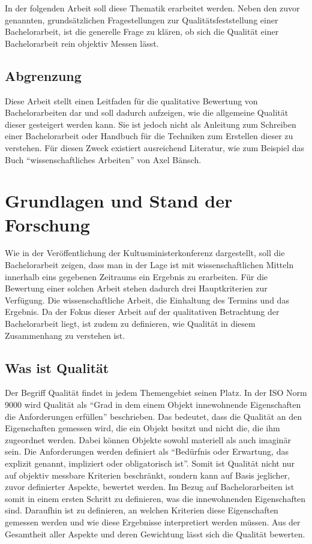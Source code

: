 In der folgenden Arbeit soll diese Thematik erarbeitet werden. Neben den zuvor genannten, grundsätzlichen Fragestellungen zur Qualitätsfeststellung einer Bachelorarbeit, ist die generelle Frage zu klären, ob sich die Qualität einer Bachelorarbeit rein objektiv Messen lässt. 

\section{Abgrenzung}
Diese Arbeit stellt einen Leitfaden für die qualitative Bewertung von Bachelorarbeiten dar und soll dadurch aufzeigen, wie die allgemeine Qualität dieser gesteigert werden kann. Sie ist jedoch nicht als Anleitung zum Schreiben einer Bachelorarbeit oder Handbuch für die Techniken zum Erstellen dieser zu verstehen. Für diesen Zweck existiert ausreichend Literatur, wie zum Beispiel das Buch \enquote{wissenschaftliches Arbeiten} von Axel Bänsch.\cite{Baensch:2013}

\chapter{Grundlagen und Stand der Forschung}
Wie in der Veröffentlichung der Kultusministerkonferenz dargestellt, soll die Bachelorarbeit zeigen, dass man in der Lage ist mit wissenschaftlichen Mitteln innerhalb eins gegebenen Zeitraums ein Ergebnis zu erarbeiten. Für die Bewertung einer solchen Arbeit stehen dadurch drei Hauptkriterien zur Verfügung. Die wissenschaftliche Arbeit, die Einhaltung des Termins und das Ergebnis. Da der Fokus dieser Arbeit auf der qualitativen Betrachtung der Bachelorarbeit liegt, ist zudem zu definieren, wie Qualität in diesem Zusammenhang zu verstehen ist.

\section{Was ist Qualität}
Der Begriff Qualität findet in jedem Themengebiet seinen Platz. In der \ac{ISO} Norm 9000 wird Qualität als \enquote{Grad in dem einem Objekt innewohnende Eigenschaften die Anforderungen erfüllen}\cite[Vgl.][Kapitel 3.6.2]{iso9000:2015} beschrieben. Das bedeutet, dass die Qualität an den Eigenschaften gemessen wird, die ein Objekt besitzt und nicht die, die ihm zugeordnet werden. Dabei können Objekte sowohl materiell als auch imaginär sein. Die Anforderungen werden definiert als \enquote{Bedürfnis oder Erwartung, das explizit genannt, impliziert oder obligatorisch ist}\cite[Vgl.][Kapitel 3.6.4]{iso9000:2015}. Somit ist Qualität nicht nur auf objektiv messbare Kriterien beschränkt, sondern kann auf Basis jeglicher, zuvor definierter Aspekte, bewertet werden. Im Bezug auf Bachelorarbeiten ist somit in einem ersten Schritt zu definieren, was die innewohnenden Eigenschaften sind. Daraufhin ist zu definieren, an welchen Kriterien diese Eigenschaften gemessen werden und wie diese Ergebnisse interpretiert werden müssen. Aus der Gesamtheit aller Aspekte und deren Gewichtung lässt sich die Qualität bewerten.

